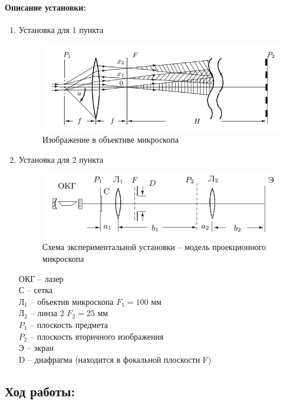 \documentclass[a4paper,12pt]{article}
\begin{document}
\paragraph{Описание установки:}
\begin{enumerate}
\itemsep0em
\item Установка для 1 пункта
\begin{figure}[h!]
\centering
\includegraphics[scale=0.8]{setup_0.png}
\caption{Изображение в объективе микроскопа} 
\end{figure}
\item Установка для 2 пункта\\
\begin{figure}[h!]
\centering
\includegraphics[scale=0.5]{setup.png}
\caption{Схема экспериментальной установки -- модель проекционного микроскопа} 
\end{figure}
ОКГ -- лазер\\
С -- сетка\\
Л$_1$ -- объектив микроскопа $F_1 = 100$ мм\\
Л$_2$ -- линза 2 $F_2 = 25$ мм\\
$P_1$ -- плоскость предмета\\
$P_2$ -- плоскость вторичного изображения\\
Э -- экран\\
D -- диафрагма (находится в фокальной плоскости F)
\end{enumerate}
\subsection*{Ход работы:}
\end{document}
